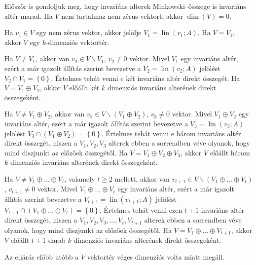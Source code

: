\documentclass[a4paper, showtrims]{memoir}
\makeatletter
\renewenvironment{proof}[1][\proofname]
    {\par\pushQED{\qed}%
    \normalfont \topsep6\p@\@plus6\p@\relax
    \trivlist
    \item[\hskip\labelsep
        \itshape
    #1\@addpunct{:}]\ignorespaces}
    {\popQED\endtrivlist\@endpefalse}
\theoremstyle{plain}
\theoremstyle{remark}
\theoremstyle{definition}
\DeclareMathOperator{\lin}{lin}
\makeatother
\begin{document}
\begin{proof}[Bizonyítás (3.)]
	Először is gondoljuk meg, hogy invariáns alterek Minkowski--összege is invariáns altér marad.
	Ha $V$ nem tartalmaz nem zérus vektort, akkor $\dim(V)= 0$.

	Ha $v_1\in V$ egy nem zérus vektor,
	akkor jelölje $V_1=\lin\left( v_1;A \right)$.
	Ha $V=V_1$,
	akkor $V$ egy $k$-dimenziós vektortér.

	Ha $V\neq V_1$, akkor van $v_2\in V\smallsetminus V_1$, $v_2\neq 0$ vektor.
	Mivel $V_1$ egy invariáns altér,
	ezért a már igazolt állítás szerint bevezetve a $V_2=\lin\left( v_2;A \right)$
	jelölést $V_2\cap V_1=\left\{ 0 \right\}$.
	Értelmes tehát venni e két invariáns altér direkt összegét.
	Ha $V=V_1\oplus V_2$, akkor $V$ előállt két $k$ dimenziós invariáns alterének direkt összegeként.

	Ha $V\neq V_1\oplus V_2$, akkor van $v_3\in V\smallsetminus (V_1\oplus V_2)$, $v_3\neq 0$ vektor.
	Mivel $V_1\oplus V_2$ egy invariáns altér,
	ezért a már igazolt állítás szerint bevezetve a $V_3=\lin\left( v_3;A \right)$
	jelölést $V_3\cap (V_1\oplus V_2)=\left\{ 0 \right\}$.
	Értelmes tehát venni e három invariáns altér direkt összegét, hiszen
	a $V_1,V_2,V_3$ alterek ebben a sorrendben véve olyanok,
	hogy mind diszjunkt az előzőek összegétől.
	Ha $V=V_1\oplus V_2\oplus V_3$,
	akkor $V$ előállt három $k$ dimenziós invariáns alterének direkt összegeként.

	Ha $V\neq V_1\oplus\dots\oplus V_t$, valamely $t\geq 2$ mellett,
    akkor van $v_{t+1}\in V\smallsetminus (V_1\oplus\dots\oplus V_t)$, $v_{t+1}\neq 0$ vektor.
	Mivel $V_1\oplus\dots\oplus V_t$ egy invariáns altér,
	ezért a már igazolt állítás szerint bevezetve a $V_{t+1}=\lin\left( v_{t+1};A \right)$
	jelölést $V_{t+1}\cap (V_1\oplus\dots\oplus V_t)=\left\{ 0 \right\}$.
	Értelmes tehát venni ezen $t+1$ invariáns altér direkt összegét, hiszen
	a $V_1,V_2,V_3,\ldots,V_t,V_{t+1}$ alterek ebben a sorrendben véve olyanok,
	hogy mind diszjunkt az előzőek összegétől.
	Ha $V=V_1\oplus\dots\oplus V_{t+1}$,
	akkor $V$ előállt $t+1$ darab $k$ dimenziós invariáns alterének direkt összegeként.

	Az eljárás előbb utóbb a $V$ vektortér véges dimenziós volta miatt megáll.
\end{proof}
\end{document}

